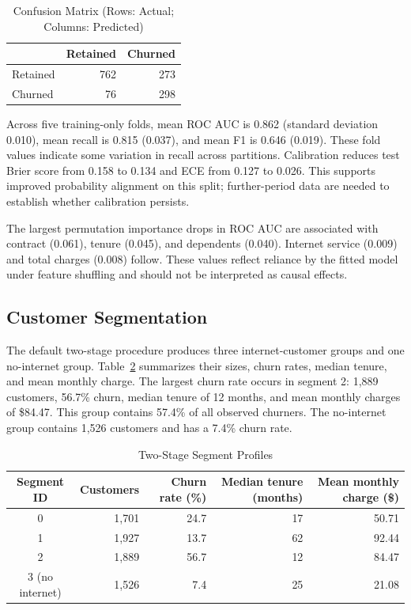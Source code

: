 \documentclass[conference]{IEEEtran}
\begin{document}
\begin{table}[!t]
\centering
\caption{Confusion Matrix (Rows: Actual; Columns: Predicted)}
\label{tab:cm}
\begin{tabular}{lrr}
\toprule
 & Retained & Churned \\
\midrule
Retained & 762 & 273 \\
Churned & 76 & 298 \\
\bottomrule
\end{tabular}
\end{table}

Across five training-only folds, mean ROC AUC is 0.862 (standard deviation 0.010), mean recall is 0.815 (0.037), and mean F1 is 0.646 (0.019). These fold values indicate some variation in recall across partitions. Calibration reduces test Brier score from 0.158 to 0.134 and ECE from 0.127 to 0.026. This supports improved probability alignment on this split; further-period data are needed to establish whether calibration persists.

The largest permutation importance drops in ROC AUC are associated with contract (0.061), tenure (0.045), and dependents (0.040). Internet service (0.009) and total charges (0.008) follow. These values reflect reliance by the fitted model under feature shuffling and should not be interpreted as causal effects.

\subsection{Customer Segmentation}
The default two-stage procedure produces three internet-customer groups and one no-internet group. Table~\ref{tab:segments} summarizes their sizes, churn rates, median tenure, and mean monthly charge. The largest churn rate occurs in segment 2: 1,889 customers, 56.7\% churn, median tenure of 12 months, and mean monthly charges of \$84.47. This group contains 57.4\% of all observed churners. The no-internet group contains 1,526 customers and has a 7.4\% churn rate.

\begin{table}[!t]
\centering
\caption{Two-Stage Segment Profiles}
\label{tab:segments}
\begin{tabular}{crrrr}
\toprule
Segment ID & Customers & Churn rate (\%) & Median tenure (months) & Mean monthly charge (\$) \\
\midrule
0 & 1,701 & 24.7 & 17 & 50.71 \\
1 & 1,927 & 13.7 & 62 & 92.44 \\
2 & 1,889 & 56.7 & 12 & 84.47 \\
3 (no internet) & 1,526 & 7.4 & 25 & 21.08 \\
\bottomrule
\end{tabular}
\end{table}
\end{document}

